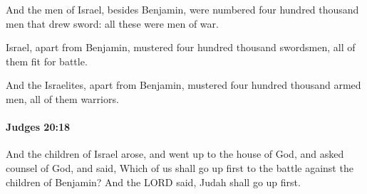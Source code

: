 			\begin{versebox}
					\item[BHS] 
					\item[ASV] And the men of Israel, besides Benjamin, were numbered four hundred thousand men that drew sword: all these were men of war.
					\item[NIV] Israel, apart from Benjamin, mustered four hundred thousand swordsmen, all of them fit for battle.
					\item[NRSV] And the Israelites, apart from Benjamin, mustered four hundred thousand armed men, all of them warriors.
			\end{versebox}

		\paragraph{Judges 20:18} %
			\label{JUDGES-20-18}

			And the children of Israel arose, and went up to the house of God, and asked counsel of God, and said, Which of us shall go up first to the battle against the children of Benjamin? And the LORD said, Judah shall go up first.

